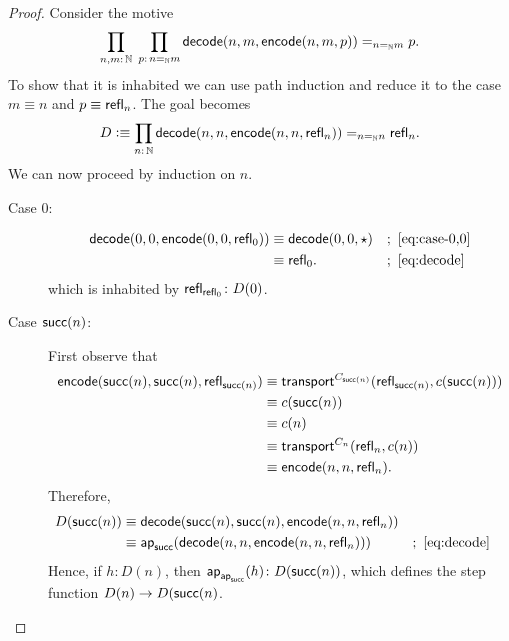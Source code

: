 \begin{proof}
    Consider the motive
    \[
        \prod_{n,m\colon\N}\;
        \prod_{p\colon n\eq\N m}
            \fun{decode}(n,m,\fun{encode}(n,m,p))\eq{n\eq\N m}p.
    \]
    To show that it is inhabited we can use path induction and reduce it to the case $m\equiv n$ and $p\equiv\mathsf{refl}_n$. The goal becomes
    \[
        D\defeq\prod_{n\colon\N}
            \fun{decode}
                (n,
                n,
                \fun{encode}(n,n,\fun{refl}_n))
            \eq{n\eq\N n}\fun{refl}_n.
    \]
    We can now proceed by induction on $n$.
    \begin{description}
        \item[Case $0$:]
        \begin{align*}
            \mathsf{decode}(0,0,\mathsf{encode}(0,0,\mathsf{refl}_0))
                &\equiv\mathsf{decode}(0,0,\mathsf{\star})
                    &&;\ \eqref{eq:case-0,0}\\
                &\equiv\mathsf{refl}_0.
                    &&;\ \eqref{eq:decode}
        \end{align*}
        which is inhabited by $\fun{refl}_{\fun{refl}_0}\colon D(0)$.
        
        \item[Case $\mathsf{succ}(n)$:]
        First observe that
        \begin{align*}
            \mathsf{encode}
                    (\mathsf{succ}(n),
                    \mathsf{succ}(n),
                    \mathsf{refl}_{\mathsf{succ}(n)})
                &\equiv\mathsf{transport}^{C_{\mathsf{succ}(n)}}
                    (\mathsf{refl}_{\mathsf{succ}(n)},c(\mathsf{succ}(n)))\\
                &\equiv c(\mathsf{succ}(n))\\
                &\equiv c(n)\\
                &\equiv\mathsf{transport}^{C_n}(\mathsf{refl}_n,c(n))\\
                &\equiv\mathsf{encode}(n,n,\mathsf{refl}_n).
        \end{align*}
        Therefore,
        \begin{align*}
            D(\mathsf{succ}(n))
                &\equiv\mathsf{decode}
                    (\mathsf{succ}(n),
                    \mathsf{succ}(n),
                    \mathsf{encode}(n,n,\mathsf{refl}_n))\\
                &\equiv\mathsf{ap}_{\mathsf{succ}}
                    (\mathsf{decode}(n,n,\mathsf{encode}(n,n,\mathsf{refl}_n)))
                    &&;\ \eqref{eq:decode}
        \end{align*}
        Hence, if $h\colon D(n)$, then $\fun{ap}_{\fun{ap}_{\fun{succ}}}(h)\colon D(\fun{succ}(n))$, which defines the step function $D(n)\to D(\mathsf{succ}(n)$.
    \end{description}
\end{proof}


